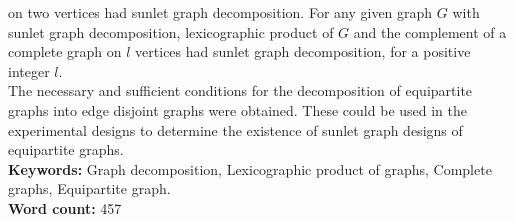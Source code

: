 \documentclass[12pt]{report}
\begin{document}
on two vertices had sunlet graph decomposition. For any given graph
$G$ with sunlet graph decomposition, lexicographic product of $G$
and the complement of a complete graph on $l$ vertices had sunlet
graph decomposition, for a positive integer $l$.\\
The necessary and sufficient conditions for the decomposition of equipartite graphs into edge disjoint graphs were obtained. These could be used in the experimental designs to determine the existence of sunlet graph designs of equipartite graphs.
\\
{\bf Keywords:} Graph decomposition, Lexicographic product of graphs, Complete graphs, Equipartite graph.\\
{\bf Word count:} 457
\end{document}
